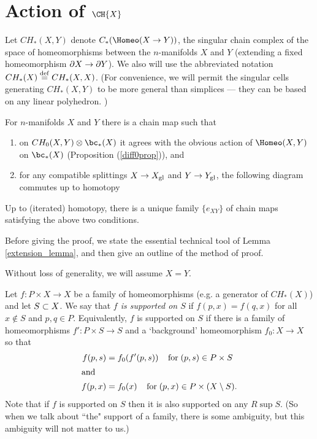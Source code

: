 
\section{Action of \texorpdfstring{$\CH{X}$}{$C_*(Homeo(M))$}}
\label{sec:evaluation}


Let $CH_*(X, Y)$ denote $C_*(\Homeo(X \to Y))$, the singular chain complex of
the space of homeomorphisms
between the $n$-manifolds $X$ and $Y$ (extending a fixed homeomorphism $\partial X \to \partial Y$).
We also will use the abbreviated notation $CH_*(X) \stackrel{\mathrm{def}}{=} CH_*(X, X)$.
(For convenience, we will permit the singular cells generating $CH_*(X, Y)$ to be more general
than simplices --- they can be based on any linear polyhedron.
)

\begin{prop}  \label{CHprop}
For $n$-manifolds $X$ and $Y$ there is a chain map
such that
\begin{enumerate}
\item on $CH_0(X, Y) \otimes \bc_*(X)$ it agrees with the obvious action of 
$\Homeo(X, Y)$ on $\bc_*(X)$ (Proposition (\ref{diff0prop})), and
\item for any compatible splittings $X\to X_\mathrm{gl}$ and $Y\to Y_\mathrm{gl}$, 
the following diagram commutes up to homotopy
\end{enumerate}
Up to (iterated) homotopy, there is a unique family $\{e_{XY}\}$ of chain maps
satisfying the above two conditions.
\end{prop}

Before giving the proof, we state the essential technical tool of Lemma \ref{extension_lemma}, 
and then give an outline of the method of proof.

Without loss of generality, we will assume $X = Y$.

\medskip

Let $f: P \times X \to X$ be a family of homeomorphisms (e.g. a generator of $CH_*(X)$)
and let $S \subset X$.
We say that {\it $f$ is supported on $S$} if $f(p, x) = f(q, x)$ for all
$x \notin S$ and $p, q \in P$. Equivalently, $f$ is supported on $S$ if 
there is a family of homeomorphisms $f' : P \times S \to S$ and a `background'
homeomorphism $f_0 : X \to X$ so that
\begin{align*}
	f(p,s) & = f_0(f'(p,s)) \;\;\;\; \mbox{for}\; (p, s) \in P\times S \\
\intertext{and}
	f(p,x) & = f_0(x) \;\;\;\; \mbox{for}\; (p, x) \in {P \times (X \setminus S)}.
\end{align*}
Note that if $f$ is supported on $S$ then it is also supported on any $R \sup S$.
(So when we talk about ``the" support of a family, there is some ambiguity,
but this ambiguity will not matter to us.)

